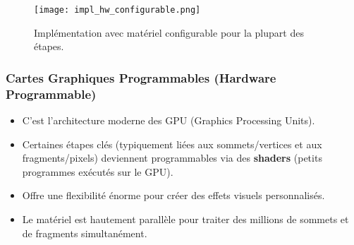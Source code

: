 \documentclass{article}
\begin{document}
\begin{figure}[H]
\centering
\texttt{[image: impl\_hw\_configurable.png]}
\caption{Implémentation avec matériel configurable pour la plupart des étapes.}
\label{fig:impl_hw_configurable}
\end{figure}

\subsubsection{Cartes Graphiques Programmables (Hardware Programmable)}
\begin{itemize}
    \item C'est l'architecture moderne des GPU (Graphics Processing Units).
    \item Certaines étapes clés (typiquement liées aux sommets/vertices et aux fragments/pixels) deviennent programmables via des \textbf{shaders} (petits programmes exécutés sur le GPU).
    \item Offre une flexibilité énorme pour créer des effets visuels personnalisés.
    \item Le matériel est hautement parallèle pour traiter des millions de sommets et de fragments simultanément.
\end{itemize}
\end{document}
